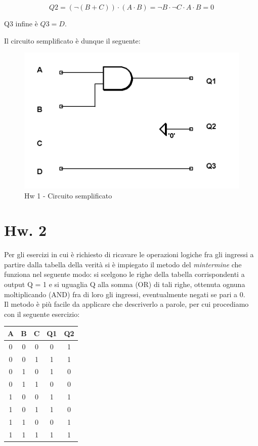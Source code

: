 \documentclass[journal, a4paper]{IEEEtran}
\begin{document}
\begin{equation}
Q2 = (\lnot (B + C)) \cdot (A \cdot B) = \lnot B \cdot \lnot C \cdot A \cdot B = 0
\end{equation}

Q3 infine è $Q3 = D$.

Il circuito semplificato è dunque il seguente:

\begin{figure}[h]
\centering
\includegraphics[width=0.8\linewidth]{./hw1_bis}
\caption{Hw 1 - Circuito semplificato}
\label{fig:hw1_bis}
\end{figure}


\section{Hw. 2}
Per gli esercizi in cui è richiesto di ricavare le operazioni logiche fra gli ingressi a partire dalla tabella della verità si è impiegato il metodo del \textit{mintermine} che funziona nel seguente modo: si scelgono le righe della tabella corrispondenti a output Q = 1 e si uguaglia Q alla somma (OR) di tali righe, ottenuta ognuna moltiplicando (AND) fra di loro gli ingressi, eventualmente negati se pari a 0.\\
Il metodo è più facile da applicare che descriverlo a parole, per cui procediamo con il seguente esercizio:

\begin{table}[h]
\centering
\begin{tabular}{c|c|c||c|c}
\hline \textbf{A} & \textbf{B} & \textbf{C} & \textbf{Q1} & \textbf{Q2} \\ 
\hline 0 & 0 & 0 & 0 & 1 \\ 
\hline 0 & 0 & 1 & 1 & 1 \\ 
\hline 0 & 1 & 0 & 1 & 0 \\ 
\hline 0 & 1 & 1 & 0 & 0 \\ 
\hline 1 & 0 & 0 & 1 & 1 \\ 
\hline 1 & 0 & 1 & 1 & 0 \\ 
\hline 1 & 1 & 0 & 0 & 1 \\ 
\hline 1 & 1 & 1 & 1 & 1 \\ 
\hline
\end{tabular} 
\end{table}
\end{document}
